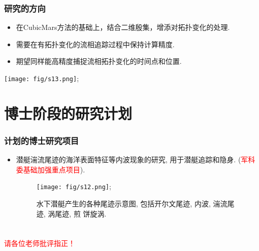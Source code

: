 \documentclass[UTF8]{ctexbeamer}	%
\theoremstyle{plain}
\theoremstyle{definition}
\theoremstyle{remark}
\numberwithin{equation}{section}
\begin{document}
\begin{frame}
    \frametitle{研究的方向} 
    \begin{itemize}
        \item 在CubicMars方法的基础上，结合二维殷集，增添对拓扑变化的处理.
        \item 需要在有拓扑变化的流相追踪过程中保持计算精度.
        \item 期望同样能高精度捕捉流相拓扑变化的时间点和位置.
    \end{itemize}
    \centering
    \texttt{[image: fig/s13.png]};
\end{frame}

\section{博士阶段的研究计划}
\begin{frame}
    \frametitle{计划的博士研究项目}
    \begin{itemize}
        \item 潜艇湍流尾迹的海洋表面特征等内波现象的研究, 用于潜艇追踪和隐身.
        (\textcolor{red}{军科委基础加强重点项目}).
        \begin{figure}
            \texttt{[image: fig/s12.png]};
            \caption{水下潜艇产生的各种尾迹示意图, 包括开尔文尾迹, 内波, 湍流尾迹, 涡尾迹, 煎
            饼旋涡.}
        \end{figure}
    \end{itemize}
\end{frame}

\section*{}
\begin{frame}
    \centering\huge
    \textcolor{red}{请各位老师批评指正！}
\end{frame}
\end{document}
